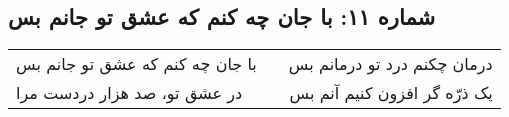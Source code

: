 \begin{center}
\section*{شماره ۱۱: با جان چه کنم که عشق تو جانم بس}
\label{sec:011}
\begin{longtable}{l p{0.5cm} r}
با جان چه کنم که عشق تو جانم بس
&&
درمان چکنم درد تو درمانم بس
\\
در عشق تو، صد هزار دردست مرا
&&
یک ذرّه گر افزون کنیم آنم بس
\\
\end{longtable}
\end{center}
